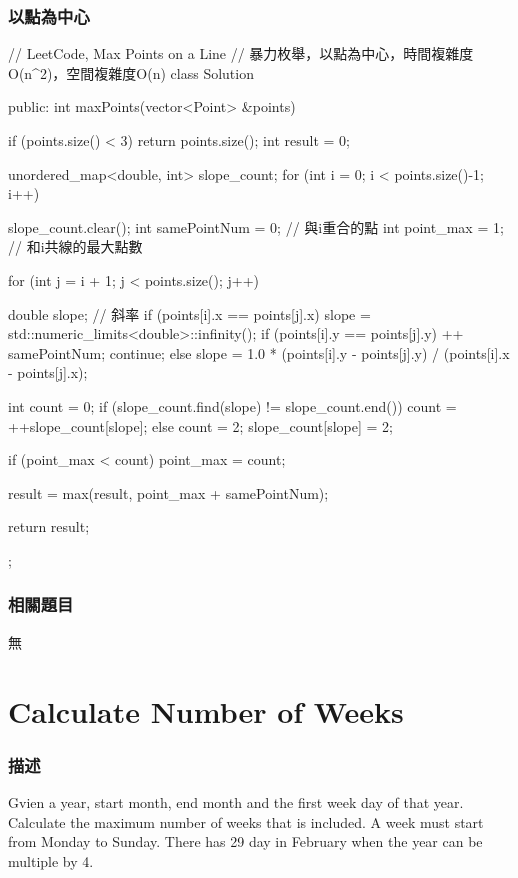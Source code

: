 \subsubsection{以點為中心}
\begin{Code}
// LeetCode, Max Points on a Line
// 暴力枚舉，以點為中心，時間複雜度O(n^2)，空間複雜度O(n)
class Solution {
public:
    int maxPoints(vector<Point> &points) {
        if (points.size() < 3) return points.size();
        int result = 0;

        unordered_map<double, int> slope_count;
        for (int i = 0; i < points.size()-1; i++) {
            slope_count.clear();
            int samePointNum = 0; // 與i重合的點
            int point_max = 1;    // 和i共線的最大點數

            for (int j = i + 1; j < points.size(); j++) {
                double slope; // 斜率
                if (points[i].x == points[j].x) {
                    slope = std::numeric_limits<double>::infinity();
                    if (points[i].y == points[j].y) {
                        ++ samePointNum;
                        continue;
                    }
                } else {
                    slope = 1.0 * (points[i].y - points[j].y) /
                        (points[i].x - points[j].x);
                }

                int count = 0;
                if (slope_count.find(slope) != slope_count.end())
                    count = ++slope_count[slope];
                else {
                    count = 2;
                    slope_count[slope] = 2;
                }

                if (point_max < count) point_max = count;
            }
            result = max(result, point_max + samePointNum);
        }
        return result;
    }
};
\end{Code}


\subsubsection{相關題目}
\begindot
\item 無
\myenddot

\section{Calculate Number of Weeks} %
\label{sec:calculate-number-of-weeks}

\subsubsection{描述}
Gvien a year, start month, end month and the first week day of that year. Calculate the maximum number of weeks that is included.
A week must start from Monday to Sunday. There has 29 day in February when the year can be multiple by 4.

